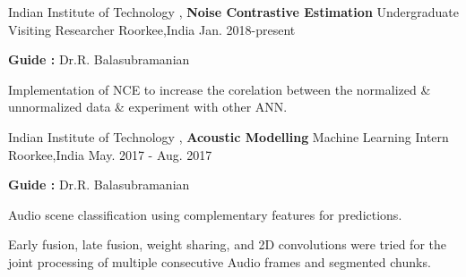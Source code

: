 \begin{cventries}
\cventry
    {Indian Institute of Technology , \textbf{Noise Contrastive Estimation}}
    {Undergraduate Visiting Researcher}
    {Roorkee,India}
    {Jan. 2018-present}
    {
      \begin{cvitems}
         \item {\textbf{Guide :} Dr.R. Balasubramanian}
          \item {Implementation of NCE to increase the corelation between the normalized \& unnormalized data \& experiment with other ANN. }
      \end{cvitems}
    }
\cventry
    {Indian Institute of Technology , \textbf{Acoustic Modelling}}
    {Machine Learning Intern}
    {Roorkee,India}
    {May. 2017 - Aug. 2017}
    {
      \begin{cvitems}
       \item {\textbf{Guide :} Dr.R. Balasubramanian}
        \item {Audio scene classification using complementary features for predictions.}
          \item {Early fusion, late fusion, weight sharing, and 2D convolutions were tried for the joint processing of multiple consecutive Audio frames and segmented chunks.}
      \end{cvitems}
    }
 
    
\end{cventries}
